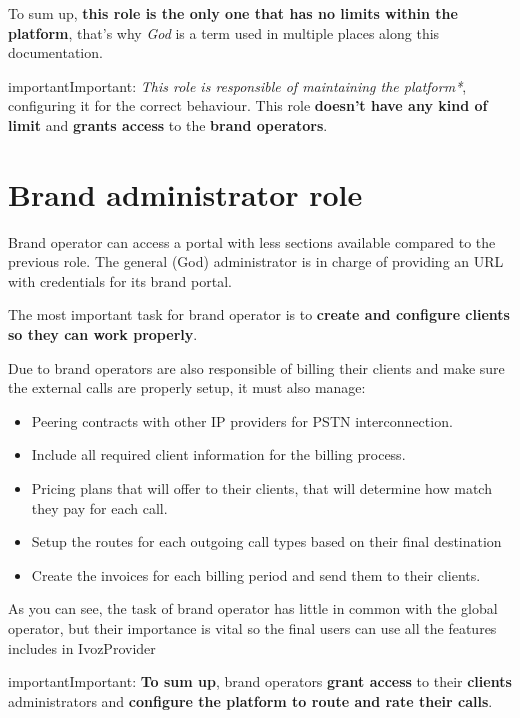 \documentclass[letterpaper,10pt,english]{sphinxmanual}
\begin{document}
To sum up, \textbf{this role is the only one that has no limits within the
platform}, that's why \emph{God} is a term used in multiple places along this
documentation.

\begin{notice}{important}{Important:}
\emph{This role is responsible of maintaining the platform*}, configuring
it for the correct behaviour. This role \textbf{doesn't have any kind
of limit} and \textbf{grants access} to the \textbf{brand operators}.
\end{notice}


\section{Brand administrator role}
\label{basic_concepts/operation_roles/index:brand-administrator-role}
Brand operator can access a portal with less sections available compared
to the previous role. The general (God) administrator is in charge of
providing an URL with credentials for its brand portal.

The most important task for brand operator is to \textbf{create and configure
clients so they can work properly}.

Due to brand operators are also responsible of billing their clients and
make sure the external calls are properly setup, it must also manage:
\begin{itemize}
\item {} 
Peering contracts with other IP providers for PSTN interconnection.

\item {} 
Include all required client information for the billing process.

\item {} 
Pricing plans that will offer to their clients, that will determine how
match they pay for each call.

\item {} 
Setup the routes for each outgoing call types based on their final
destination

\item {} 
Create the invoices for each billing period and send them to their
clients.

\end{itemize}

As you can see, the task of brand operator has little in common with the
global operator, but their importance is vital so the final users can use
all the features includes in IvozProvider
\label{basic_concepts/operation_roles/index:brand-responsibilities}
\begin{notice}{important}{Important:}
\textbf{To sum up}, brand operators \textbf{grant access} to their
\textbf{clients} administrators and \textbf{configure the platform
to route and rate their calls}.
\end{notice}
\end{document}
